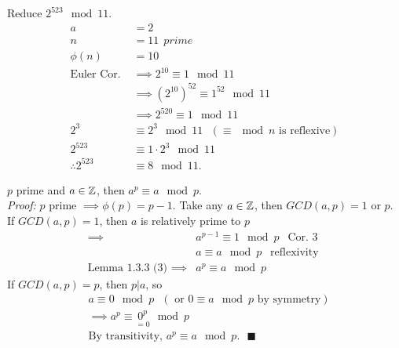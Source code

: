 \begin{example}
Reduce $2^{523}\mod 11$.
\begin{align}
    a&=2 \nonumber \\
    n&=11 \ \ \textit{prime} \nonumber \\
    \phi(n)&= 10 \nonumber \\
    \text{Euler Cor. }&\implies 2^{10}\equiv 1 \mod 11 \nonumber \\
    &\implies (2^{10})^{52}\equiv 1^{52}\mod 11 \nonumber \\
    &\implies 2^{520}\equiv 1 \mod 11 \nonumber \\
    2^3&\equiv 2^3\mod 11 \ \ \ (\equiv \mod n \text{ is reflexive})\nonumber \\
    2^{523}&\equiv 1\cdot 2^{3}\mod 11\nonumber \\
    \therefore 2^{523}&\equiv 8 \mod 11 . \nonumber
\end{align}
\end{example}
\setcounter{dummy_lemma}{0}
\begin{corollary}
$p$ prime and $a\in {\mathbb{Z}}$, then $a^p\equiv a \mod p$. \\
\textit{Proof:} $p$ prime $\implies \phi(p)=p-1$. Take any $a\in {\mathbb{Z}}$, then $GCD(a,p)=1$ or $p$. \\
If $GCD(a,p)=1$, then $a$ is relatively prime to $p$
\begin{align}
    \implies &a^{p-1}\equiv 1\mod p \ \ \text{ Cor. 3}\nonumber \\
    &a\equiv a \mod p \ \ \text{ reflexivity } \nonumber \\
    \text{Lemma 1.3.3 (3) }\implies &a^p\equiv a\mod p \nonumber
\end{align}
If $GCD(a,p)=p$, then $p|a$, so
\begin{align}
    &a\equiv 0 \mod p \ \ \ (\text{ or } 0\equiv a \mod p \text{ by symmetry})\nonumber \\
    &\implies a^p\equiv \underset{=0}{0^p}\mod p \nonumber \\
    &\text{By transitivity, }a^p\equiv a \mod p. \ \ \ \blacksquare \nonumber
\end{align}
\end{corollary}

